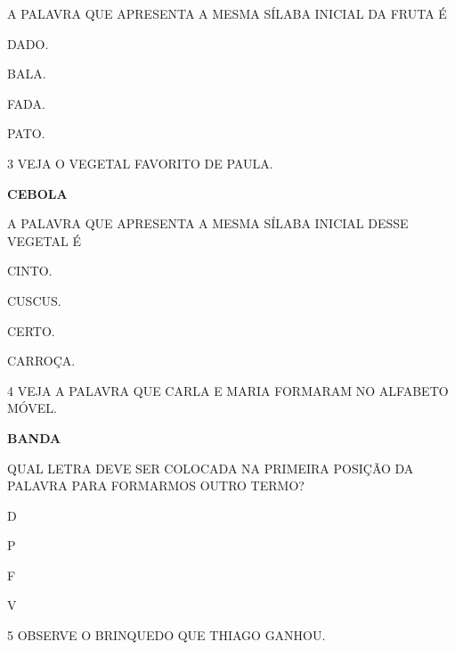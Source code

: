 A PALAVRA QUE APRESENTA A MESMA SÍLABA INICIAL DA FRUTA É

\begin{escolha}

\item DADO.

\item BALA.

\item FADA.

\item PATO.

\end{escolha}

\num{3} VEJA O VEGETAL FAVORITO DE PAULA.

\begin{center}
\textbf{CEBOLA}
\end{center}

A PALAVRA QUE APRESENTA A MESMA SÍLABA INICIAL DESSE VEGETAL É

\begin{escolha}

\item CINTO.

\item CUSCUS.

\item CERTO.

\item CARROÇA.

\end{escolha}

\num{4} VEJA A PALAVRA QUE CARLA E MARIA FORMARAM NO ALFABETO MÓVEL.

\begin{center}
\textbf{BANDA}
\end{center}

QUAL LETRA DEVE SER COLOCADA NA PRIMEIRA POSIÇÃO DA PALAVRA PARA FORMARMOS OUTRO TERMO?

\begin{escolha}

\item D

\item P

\item F

\item V

\end{escolha}

\num{5} OBSERVE O BRINQUEDO QUE THIAGO GANHOU.

